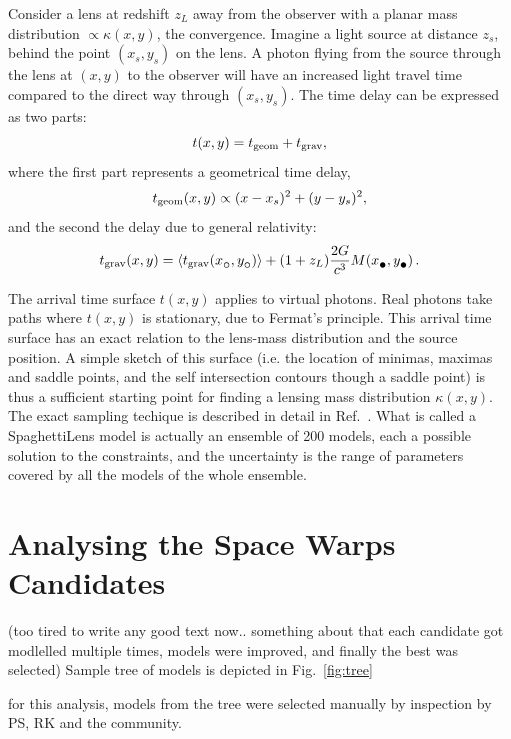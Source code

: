 \documentclass{ws-procs975x65}
\newcommand{\spl}{SpaghettiLens\xspace}
\newcommand{\sw}{Space Warps\xspace}
\newcommand{\icite}[1]{Ref.~\refcite{#1}}  %
\newcommand{\figref}[1]{Fig.~\ref{fig:#1}}
\newcommand{\tgeom}{t_{\rm geom}}
\newcommand{\tgrav}{t_{\rm grav}}
\newcommand{\subcirc}{{\lower.33ex\hbox{$\circ$}}}
\newcommand{\subbullet}{{\lower.33ex\hbox{$\bullet$}}}
\begin{document}
Consider a lens at redshift $z_L$ away from the observer with a planar mass distribution $\propto\kappa(x,y)$, the convergence.
Imagine a light source at distance $z_s$, behind the point $(x_s,y_s)$ on the lens.
A photon flying from the source through the lens at $(x,y)$ to the observer will have an increased light travel time compared to the direct way through $(x_s,y_s)$.
The time delay can be expressed as two parts:
\begin{equation}  \label{eq:tarriv}
t(x,y) = t_{\rm geom} + t_{\rm grav} ,
\end{equation}
where the first part represents a geometrical time delay,
\begin{equation} \label{eq:tgeom}
\tgeom(x,y) \propto (x-x_s)^2 + (y-y_s)^2 ,
\end{equation}
and the second the delay due to general relativity:
\begin{equation} \label{eq:tgrav}
\tgrav(x,y) = \left\langle \tgrav(x_\subcirc,y_\subcirc) \right\rangle
              + (1+z_L) \frac{2G}{c^3} M(x_\subbullet,y_\subbullet) \,.
\end{equation}

The arrival time surface $t(x,y)$ applies to virtual photons.
Real photons take paths where $t(x,y)$ is stationary, due to Fermat's principle.
This arrival time surface has an exact relation to the lens-mass distribution and the source position.
A simple sketch of this surface (i.e. the location of minimas, maximas and saddle points, and the self intersection contours though a saddle point) is thus a sufficient starting point for finding a lensing mass distribution $\kappa(x,y)$. The exact sampling techique is described in detail in \icite{Lubini2012}.
What is called a \spl model is actually an ensemble of 200 models, each a possible solution to the constraints, and the uncertainty is the range of parameters covered by all the models of the whole ensemble.


\section{Analysing the \sw Candidates}

(too tired to write any good text now..
something about that each candidate got modlelled multiple times, models were improved, and finally the best was selected) Sample tree of models is depicted in \figref{tree}

for this analysis, models from the tree were selected manually by inspection by PS, RK and the community.
\end{document}
